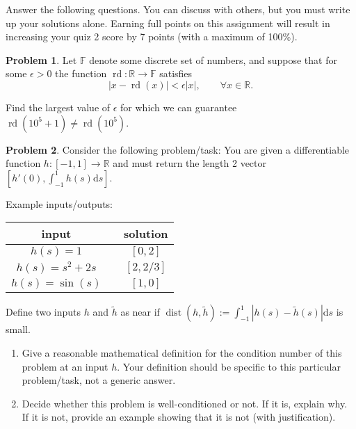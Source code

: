 \documentclass[12pt]{article}
\theoremstyle{definition}
\newtheorem{problem}{Problem}
\renewcommand{\d}{\mathrm{d}}
\begin{document}
    \textbf{\Large{}}
    
    \vspace{-1.8em}
    \hrulefill
\vspace{.25em} 

Answer the following questions. 
You can discuss with others, but you must write up your solutions alone.
Earning full points on this assignment will result in increasing your quiz 2 score by 7 points (with a maximum of 100\%).

\vspace{2.5em}
\begin{problem}
    Let $\mathbb{F}$ denote some discrete set of numbers, and suppose that for some $\epsilon>0$ the function $\operatorname{rd}:\mathbb{R} \to \mathbb{F}$ satisfies
    \[
        |x - \operatorname{rd}(x)|< \epsilon |x|
        ,\qquad \forall x\in\mathbb{R}.
    \]

    Find the largest value of $\epsilon$ for which we can guarantee
    $\operatorname{rd}(10^5+1) \neq \operatorname{rd}(10^5)$. 

\end{problem}

\vspace{2em}
\begin{problem}
    Consider the following problem/task: You are given a differentiable function $h:[-1,1]\to \mathbb{R}$ and must return the length 2 vector $[h'(0),\int_{-1}^{1} h(s) \d{s}]$.

            Example inputs/outputs:\vspace{-.5em}
            \begin{center}
                \begin{tabular}{ccc}
            \toprule
                    input && solution \\ \midrule
                    $h(s) = 1$ && $[0,2]$ \\
                    $h(s) = s^2+2s$ && $[2,2/3]$ \\
                    $h(s) = \sin(s)$ && $[1,0]$ \\
                \bottomrule
            \end{tabular}
            \end{center}

    Define two inputs $h$ and $\tilde{h}$ as near if $\operatorname{dist}(h,\tilde{h}):=  \int_{-1}^{1} |h(s) - \tilde{h}(s)| \d{s} $ is small.


    \begin{enumerate}[label=(\alph*)]
        \item Give a reasonable mathematical definition for the condition number of this problem at an input $h$. Your definition should be specific to this particular problem/task, not a generic answer.

        \item Decide whether this problem is well-conditioned or not. If it is, explain why. If it is not, provide an example showing that it is not (with justification). 
    \end{enumerate}

\end{problem}
\end{document}
